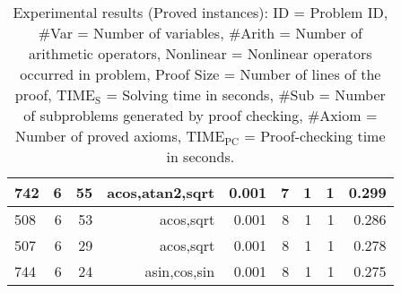 \begin{table*}[t!h!]
\begin{center}
\begin{tabular}{|l||r|r|r||r|r|r|r|r|}
\hline
742 & 6 & 55 & acos,atan2,sqrt & 0.001 & 7 & 1 & 1 & 0.299 \\
\hline
508 & 6 & 53 & acos,sqrt & 0.001 & 8 & 1 & 1 & 0.286 \\
\hline
507 & 6 & 29 & acos,sqrt & 0.001 & 8 & 1 & 1 & 0.278 \\
\hline
744 & 6 & 24 & asin,cos,sin & 0.001 & 8 & 1 & 1 & 0.275\\
\hline
\end{tabular}
  \end{center}
  \caption{
    Experimental results (Proved instances):
    ID = Problem ID,
    \#Var = Number of variables,
    \#Arith = Number of arithmetic operators,
    Nonlinear = Nonlinear operators occurred in problem,
    Proof Size = Number of lines of the proof,
    $\mathrm{TIME_S}$ = Solving time in seconds,
    \#Sub = Number of subproblems generated by proof checking,
    \#Axiom = Number of proved axioms,
    $\mathrm{TIME_{PC}}$ = Proof-checking time in seconds.
  }\label{tbl:exp}
\end{table*}

